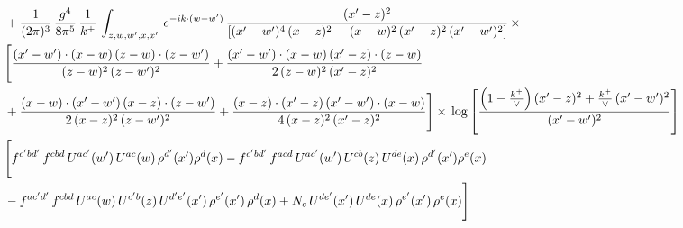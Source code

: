 \documentclass[9pt]{article}
\numberwithin{equation}{section}
\begin{document}
\begin{align}
&  + \frac{1}{(2\pi)^{3}}\, \frac{g^{4}}{8\pi^{5}}\,\frac{1}{k^{+}}\,\int_{z,w,w^{\prime},x,x'}\, e^{-ik\cdot (w-w')}\, \frac{(x'-z)^{2}}{\left[(x'-w')^{4}\,(x-z)^{2}\, - (x-w)^{2}\, (x'-z)^{2}\,(x'-w')^{2}\right]}\,  \times\notag \\ & \Bigg[\frac{(x'-w')\cdot (x-w)\, (z-w)\cdot (z-w')}{(z-w)^{2}\, (z-w')^{2}}+\frac{(x'-w')\cdot (x-w)\, (x'-z)\cdot (z-w)}{2\, (z-w)^{2}\, (x'-z)^{2}}\notag \\ & +\frac{(x-w)\cdot (x'-w')\, (x-z)\cdot (z-w')}{2\, (x-z)^{2}\, (z-w')^{2}}+\frac{(x-z)\cdot (x'-z)\, (x'-w')\cdot (x-w)}{4\, (x-z)^{2}\, (x'-z)^{2}}\Bigg] \times\,\log{\left[\frac{\left(1-\frac{k^{+}}{\vee}\right)(x'-z)^{2}+\frac{k^{+}}{\vee}\,(x'-w')^{2}}{(x'-w')^{2}}\right]} \notag \\ & \Bigg[f^{c'bd'}\,f^{cbd}\, U^{ac'}(w')\,U^{ac}(w)\,\rho^{d'}(x')\rho^{d}(x)- f^{c'bd'}\,f^{acd}\,U^{ac'}(w')\,U^{cb}(z)\,U^{de}(x)\,\rho^{d'}(x')\rho^{e}(x) \notag \\ & -f^{ac'd'}\,f^{cbd}\,U^{ac}(w)\,U^{c'b}(z)\,U^{d'e'}(x')\,\rho^{e'}(x')\,\rho^{d}(x) +N_{c}\,U^{de'}(x')\,U^{de}(x)\,\rho^{e'}(x')\,\rho^{e}(x)\Bigg]
\end{align}
\end{document}
